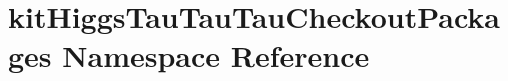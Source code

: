 \hypertarget{namespacekitHiggsTauTauTauCheckoutPackages}{
\section{kitHiggsTauTauTauCheckoutPackages Namespace Reference}
\label{namespacekitHiggsTauTauTauCheckoutPackages}
}
